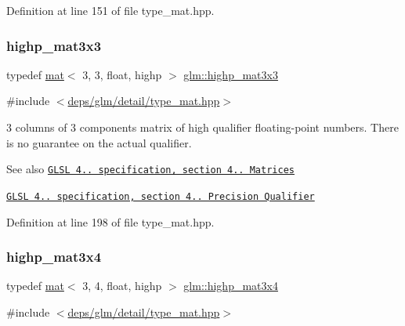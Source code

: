 Definition at line 151 of file type\+\_\+mat.\+hpp.

\mbox{\label{group__core__precision_ga83105b0c326393a133a43c426aae2a9c}} 
\subsubsection{\texorpdfstring{highp\+\_\+mat3x3}{highp\_mat3x3}}
{\footnotesize\ttfamily typedef \hyperlink{structglm_1_1mat}{mat}$<$ 3, 3, float, highp $>$ \hyperlink{group__core__precision_ga83105b0c326393a133a43c426aae2a9c}{glm\+::highp\+\_\+mat3x3}}



{\ttfamily \#include $<$\hyperlink{type__mat_8hpp}{deps/glm/detail/type\+\_\+mat.\+hpp}$>$}

3 columns of 3 components matrix of high qualifier floating-\/point numbers. There is no guarantee on the actual qualifier.

\begin{DoxySeeAlso}{See also}
\href{http://www.opengl.org/registry/doc/GLSLangSpec.4.20.8.pdf}{\tt G\+L\+SL 4.. specification, section 4.. Matrices} 

\href{http://www.opengl.org/registry/doc/GLSLangSpec.4.20.8.pdf}{\tt G\+L\+SL 4.. specification, section 4.. Precision Qualifier} 
\end{DoxySeeAlso}


Definition at line 198 of file type\+\_\+mat.\+hpp.

\mbox{\label{group__core__precision_ga201566a8dbec6e27bec9e8e96ed4cdb6}} 
\subsubsection{\texorpdfstring{highp\+\_\+mat3x4}{highp\_mat3x4}}
{\footnotesize\ttfamily typedef \hyperlink{structglm_1_1mat}{mat}$<$ 3, 4, float, highp $>$ \hyperlink{group__core__precision_ga201566a8dbec6e27bec9e8e96ed4cdb6}{glm\+::highp\+\_\+mat3x4}}



{\ttfamily \#include $<$\hyperlink{type__mat_8hpp}{deps/glm/detail/type\+\_\+mat.\+hpp}$>$}

